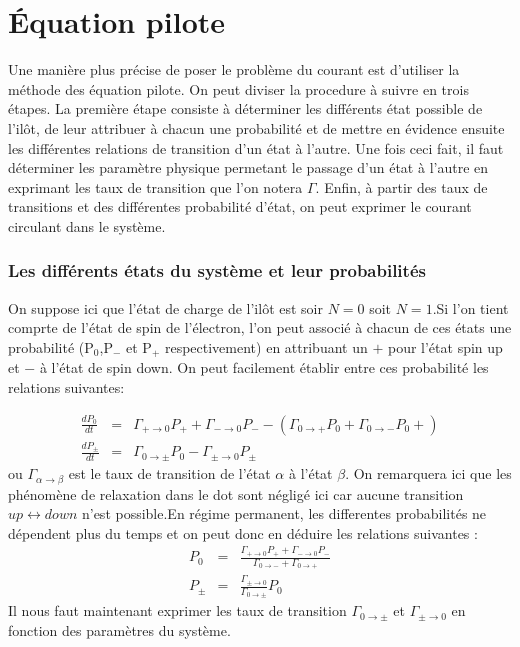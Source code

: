 \section{\'Equation pilote}
Une manière plus précise de poser le problème du courant est d'utiliser la méthode des équation pilote. On peut diviser la procedure à suivre en trois étapes. La première étape consiste à déterminer les différents état possible de l'ilôt, de leur attribuer à chacun une probabilité et de mettre en évidence ensuite les différentes relations de transition d'un état à l'autre. Une fois ceci fait, il faut déterminer les paramètre physique permetant le passage d'un état à l'autre en exprimant les taux de transition que l'on notera $\Gamma$. Enfin, à partir des taux de transitions et des différentes probabilité d'état, on peut exprimer le courant circulant dans le système.

\subsubsection{Les différents états du système et leur probabilités}
On suppose ici que l'état de charge de l'ilôt est soir $N=0$ soit $N=1$.Si l'on tient comprte de l'état de spin de l'électron, l'on peut associé à chacun de ces états une probabilité (P$_0$,P$_-$ et P$_+$ respectivement) en attribuant un $+$ pour l'état spin up et $-$ à l'état de spin down. On peut facilement établir entre ces probabilité les relations suivantes:

\begin{eqnarray}
\frac{dP_0}{dt} &=& \Gamma_{+ \rightarrow 0}P_+ + \Gamma_{- \rightarrow 0}P_-  -(\Gamma_{0 \rightarrow +}P_0 + \Gamma_{0 \rightarrow -}P_0 + ) \nonumber \\
\frac{dP_\pm}{dt} &=& \Gamma_{0 \rightarrow \pm}P_0 - \Gamma_{\pm \rightarrow 0}P_\pm \nonumber
\end{eqnarray}
ou $\Gamma_{\alpha \rightarrow \beta}$ est le taux de transition de l'état $\alpha$ à l'état $\beta$. On remarquera ici que les phénomène de relaxation dans le dot sont négligé ici car aucune transition $up \leftrightarrow down$ n'est possible.En régime permanent, les differentes probabilités ne dépendent plus du temps et on peut donc en déduire les relations suivantes :
\begin{eqnarray}
P_0 &=& \frac{\Gamma_{+ \rightarrow 0}P_{+} + \Gamma_{- \rightarrow 0}P_{-}}{\Gamma_{0 \rightarrow -} + \Gamma_{0 \rightarrow +} }\\
P_{\pm} &=& \frac{\Gamma_{\pm \rightarrow 0}}{\Gamma_{0 \rightarrow \pm}}P_0 
\end{eqnarray}
Il nous faut maintenant exprimer les taux de transition $\Gamma_{0 \rightarrow \pm}$ et $\Gamma_{\pm \rightarrow 0}$ en fonction des paramètres du système.


